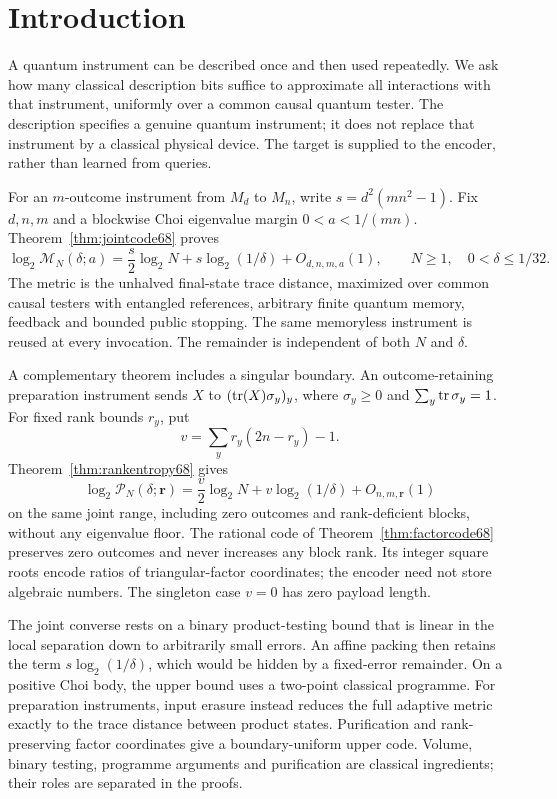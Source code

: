 \section{Introduction}
A quantum instrument can be described once and then used repeatedly.
We ask how many classical description bits suffice to approximate
all interactions with that instrument, uniformly over a common
causal quantum tester. The description specifies a genuine quantum
instrument; it does not replace that instrument by a classical
physical device. The target is supplied to the encoder, rather than
learned from queries.

For an $m$-outcome instrument from $M_d$ to $M_n$, write
$s=d^2(mn^2-1)$. Fix $d,n,m$ and a blockwise Choi eigenvalue margin
$0<a<1/(mn)$. Theorem~\ref{thm:jointcode68} proves
\begin{equation*}
 \log_2\mathcal M_N(\delta;a)
 =\frac{s}{2}\log_2 N+s\log_2(1/\delta)+O_{d,n,m,a}(1),
 \qquad N\ge1,\quad 0<\delta\le1/32.
\end{equation*}
The metric is the unhalved final-state trace distance, maximized over
common causal testers with entangled references, arbitrary finite
quantum memory, feedback and bounded public stopping. The same
memoryless instrument is reused at every invocation. The remainder
is independent of both $N$ and $\delta$.

A complementary theorem includes a singular boundary. An
outcome-retaining preparation instrument sends $X$ to
$(\operatorname{tr}(X)\sigma_y)_y$, where $\sigma_y\ge0$ and
$\sum_y\operatorname{tr}\sigma_y=1$. For fixed rank bounds $r_y$, put
\[
                  v=\sum_y r_y(2n-r_y)-1.
\]
Theorem~\ref{thm:rankentropy68} gives
\[
 \log_2\mathcal P_N(\delta;\mathbf r)
 =\frac v2\log_2N+v\log_2(1/\delta)+O_{n,m,\mathbf r}(1)
\]
on the same joint range, including zero outcomes and rank-deficient
blocks, without any eigenvalue floor. The rational code of
Theorem~\ref{thm:factorcode68} preserves zero outcomes and never
increases any block rank. Its integer square roots encode ratios of
triangular-factor coordinates; the encoder need not store algebraic
numbers. The singleton case $v=0$ has zero payload length.

The joint converse rests on a binary product-testing bound that is
linear in the local separation down to arbitrarily small errors.
An affine packing then retains the term $s\log_2(1/\delta)$, which
would be hidden by a fixed-error remainder. On a positive Choi body,
the upper bound uses a two-point classical programme. For preparation
instruments, input erasure instead reduces the full adaptive metric
exactly to the trace distance between product states. Purification
and rank-preserving factor coordinates give a boundary-uniform upper
code. Volume, binary testing, programme arguments and purification
are classical ingredients; their roles are separated in the proofs.

